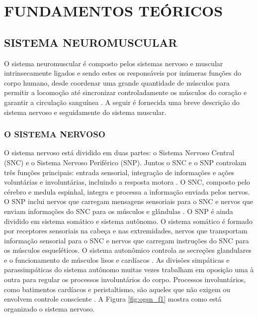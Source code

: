\chapter{FUNDAMENTOS TEÓRICOS}
\label{sec:cap2}


\section{SISTEMA NEUROMUSCULAR}

O sistema neuromuscular é composto pelos sistemas nervoso e muscular intrinsecamente ligados e sendo estes os responsáveis por inúmeras funções do corpo humano, desde coordenar uma grande quantidade de músculos para permitir a locomoção até sincronizar controladamente os músculos do coração e garantir a circulação sanguínea \cite{Moore2014}. A seguir é fornecida uma breve descrição do sistema nervoso e seguidamente do sistema muscular.

\subsection{O SISTEMA NERVOSO}

O sistema nervoso está dividido em duas partes: o Sistema Nervoso Central (\acrshort{SNC}) e o Sistema Nervoso Periférico (\acrshort{SNP}). Juntos o \acrshort{SNC} e o \acrshort{SNP} controlam três funções principais: entrada sensorial, integração de informações e ações voluntárias e involuntárias, incluindo a resposta motora \cite{Benjamin1978}. O \acrshort{SNC}, composto pelo cérebro e medula espinhal, integra e processa a informação enviada pelos nervos. O \acrshort{SNP} inclui nervos que carregam mensagens sensoriais para o \acrshort{SNC} e nervos que enviam informações do \acrshort{SNC} para os músculos e glândulas \cite{Gerard2010a}. O \acrshort{SNP} é ainda dividido em sistema somático e sistema autônomo. O sistema somático é formado por receptores sensoriais na cabeça e nas extremidades, nervos que transportam informação sensorial para o \acrshort{SNC} e nervos que carregam instruções do \acrshort{SNC} para os músculos esqueléticos. O sistema autonômico controla as secreções glandulares e o funcionamento de músculos lisos e cardíacos \cite{Mai2012}. As divisões simpáticas e parassimpáticas do sistema autônomo muitas vezes trabalham em oposição uma à outra para regular os processos involuntários do corpo. Processos involuntários, como batimentos cardíacos e peristaltismo, são aqueles que não exigem ou envolvem controle consciente \cite{Gerard2010a}. A Figura \ref{fig:ogsn_f1} mostra como está organizado o sistema nervoso. 

